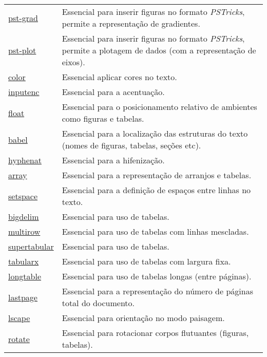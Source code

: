 \begin{longtable}{@{\extracolsep{\fill}}p{2cm} p{12cm}}
\href{https://www.ctan.org/pkg/pst-grad}{pst-grad} & Essencial para inserir figuras no formato \textit{PSTricks}, permite a representação de gradientes. \\
\href{https://www.ctan.org/pkg/pst-plot}{pst-plot} & Essencial para inserir figuras no formato \textit{PSTricks}, permite a plotagem de dados (com a representação de eixos). \\
\href{https://www.ctan.org/pkg/color}{color} & Essencial aplicar cores no texto. \\
\href{https://www.ctan.org/pkg/inputenc}{inputenc} & Essencial para a acentuação. \\
\href{https://www.ctan.org/pkg/float}{float} & Essencial para o posicionamento relativo de ambientes como figuras e tabelas. \\
\href{https://www.ctan.org/pkg/babel}{babel} & Essencial para a localização das estruturas do texto (nomes de figuras, tabelas, seções etc). \\
\href{https://www.ctan.org/pkg/hyphenat}{hyphenat} & Essencial para a hifenização. \\
\href{https://www.ctan.org/pkg/array}{array} & Essencial para a representação de arranjos e tabelas. \\
\href{https://www.ctan.org/pkg/setspace}{setspace} & Essencial para a definição de espaços entre linhas no texto. \\
\href{https://www.ctan.org/pkg/bigdelim}{bigdelim} & Essencial para uso de tabelas. \\
\href{https://www.ctan.org/pkg/multirow}{multirow} & Essencial para uso de tabelas com linhas mescladas. \\
\href{https://www.ctan.org/pkg/supertabular}{supertabular} & Essencial para uso de tabelas. \\
\href{https://www.ctan.org/pkg/tabularx}{tabularx} & Essencial para uso de tabelas com largura fixa. \\
\href{https://www.ctan.org/pkg/longtable}{longtable} & Essencial para uso de tabelas longas (entre páginas). \\
\href{https://www.ctan.org/pkg/lastpage}{lastpage} & Essencial para a representação do número de páginas total do documento. \\
\href{https://www.ctan.org/pkg/lscape}{lscape} & Essencial para orientação no modo paisagem. \\
\href{https://www.ctan.org/pkg/rotate}{rotate} & Essencial para rotacionar corpos flutuantes (figuras, tabelas). \\

\end{longtable}
